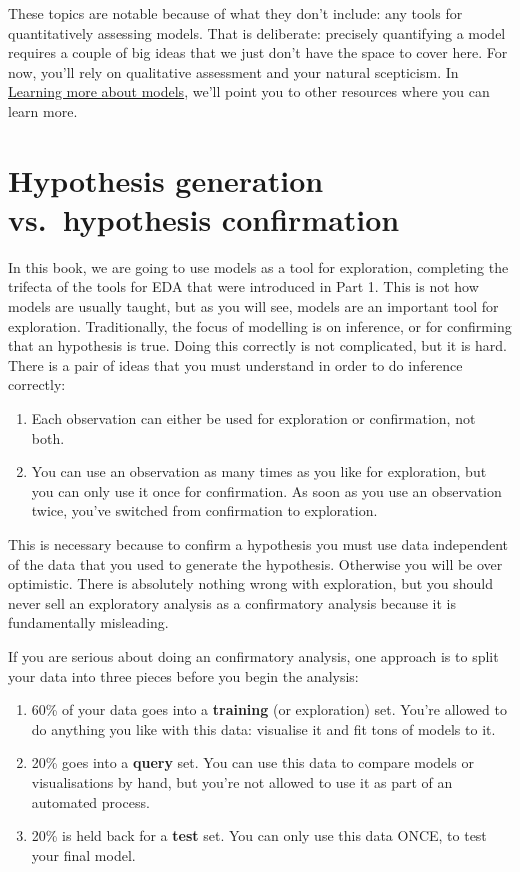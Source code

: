 \documentclass[]{book}
\begin{document}
These topics are notable because of what they don't include: any tools
for quantitatively assessing models. That is deliberate: precisely
quantifying a model requires a couple of big ideas that we just don't
have the space to cover here. For now, you'll rely on qualitative
assessment and your natural scepticism. In
\protect\hyperlink{learning-more-about-models}{Learning more about
models}, we'll point you to other resources where you can learn more.

\section{Hypothesis generation vs.~hypothesis
confirmation}\label{hypothesis-generation-vs.hypothesis-confirmation}

In this book, we are going to use models as a tool for exploration,
completing the trifecta of the tools for EDA that were introduced in
Part 1. This is not how models are usually taught, but as you will see,
models are an important tool for exploration. Traditionally, the focus
of modelling is on inference, or for confirming that an hypothesis is
true. Doing this correctly is not complicated, but it is hard. There is
a pair of ideas that you must understand in order to do inference
correctly:

\begin{enumerate}
\def\labelenumi{\arabic{enumi}.}
\item
  Each observation can either be used for exploration or confirmation,
  not both.
\item
  You can use an observation as many times as you like for exploration,
  but you can only use it once for confirmation. As soon as you use an
  observation twice, you've switched from confirmation to exploration.
\end{enumerate}

This is necessary because to confirm a hypothesis you must use data
independent of the data that you used to generate the hypothesis.
Otherwise you will be over optimistic. There is absolutely nothing wrong
with exploration, but you should never sell an exploratory analysis as a
confirmatory analysis because it is fundamentally misleading.

If you are serious about doing an confirmatory analysis, one approach is
to split your data into three pieces before you begin the analysis:

\begin{enumerate}
\def\labelenumi{\arabic{enumi}.}
\item
  60\% of your data goes into a \textbf{training} (or exploration) set.
  You're allowed to do anything you like with this data: visualise it
  and fit tons of models to it.
\item
  20\% goes into a \textbf{query} set. You can use this data to compare
  models or visualisations by hand, but you're not allowed to use it as
  part of an automated process.
\item
  20\% is held back for a \textbf{test} set. You can only use this data
  ONCE, to test your final model.
\end{enumerate}
\end{document}
